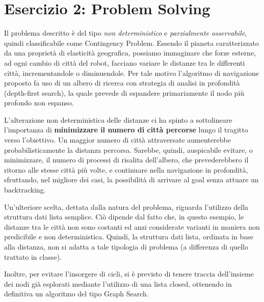 	\section{Esercizio 2: Problem Solving}
		\label{sec:es2}
		Il problema descritto è del tipo \emph{non deterministico} e \emph{parzialmente osservabile}, quindi classificabile come \textsf{Contingency Problem}. Essendo il pianeta caratterizzato da una proprietà di elasticità geografica, possiamo immaginare che forze esterne, ad ogni cambio di città del robot, facciano variare le distanze tra le differenti città, incrementandole o diminuendole. Per tale motivo l'algoritmo di navigazione proposto fa uso di un albero di ricerca con strategia di analisi in profondità (\textsf{depth-first search}), la quale prevede di espandere primariamente il nodo più profondo non espanso.\par
		L'alterazione non deterministica delle distanze ci ha spinto a sottolineare l'importanza di \textbf{minimizzare il numero di città percorse} lungo il tragitto verso l'obiettivo. Un maggior numero di città attraversate aumenterebbe probabilisticamente la distanza percorsa. Sarebbe, quindi, auspicabile evitare, o minimizzare, il numero di processi di risalita dell'albero, che prevederebbero il ritorno alle stesse città più volte, e continuare nella navigazione in profondità, sfruttando, nel migliore dei casi, la possibilità di arrivare al \textsf{goal} senza attuare un \textsf{backtracking}.\par
		Un'ulteriore scelta, dettata dalla natura del problema, riguarda l'utilizzo della struttura dati lista semplice. Ciò dipende dal fatto che, in questo esempio, le distanze tra le città non sono costanti ed anzi considerate varianti in maniera non predicibile e non deterministica. Quindi, la struttura dati lista, ordinata in base alla distanza, non si adatta a tale tipologia di problema (a differenza di quello trattato in classe).\par
		Inoltre, per evitare l'insorgere di cicli, si è previsto di tenere traccia dell'insieme dei nodi già esplorati mediante l'utilizzo di una lista \textsf{closed}, ottenendo in definitiva un algoritmo del tipo \textsf{Graph Search}.
